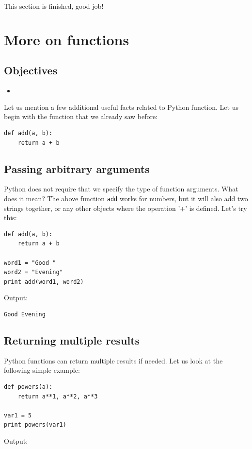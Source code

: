 \noindent
This section is finished, good job!

\section{More on functions}

\subsection{Objectives}

\begin{itemize}
\item
\end{itemize}

Let us mention a few additional useful facts related to 
Python function. Let us begin with the function that we already saw
before:

\begin{verbatim}
def add(a, b):
    return a + b
\end{verbatim}

\subsection{Passing arbitrary arguments}

Python does not require that we specify the type of function arguments. 
What does it mean? The above function {\tt add} works for 
numbers, but it will also add two strings together, or any other 
objects where the operation '+' is defined. Let's try this:

\begin{verbatim}
def add(a, b):
    return a + b

word1 = "Good "
word2 = "Evening"
print add(word1, word2)
\end{verbatim}
Output:

\begin{verbatim}
Good Evening
\end{verbatim}

\subsection{Returning multiple results}

Python functions can return multiple results if needed.
Let us look at the following simple example:

\begin{verbatim}
def powers(a):
    return a**1, a**2, a**3

var1 = 5
print powers(var1)
\end{verbatim}
Output:


